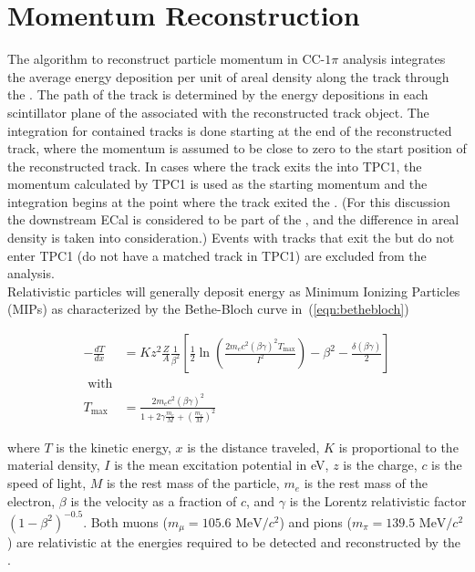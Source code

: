 \section{Momentum Reconstruction}\label{subsec:MomRecon}

The algorithm to reconstruct particle momentum in CC-$1\pi$ analysis
integrates the average energy deposition per unit of areal density
along the track through the \podtext{}. The path of the track is determined
by the energy depositions in each scintillator plane of the \podtext{}
associated with the reconstructed track object. The integration for
contained tracks is done starting at the end of the reconstructed
track, where the momentum is assumed to be close to zero to the start
position of the reconstructed track. In cases where the track exits
the \podtext{} into TPC1, the momentum calculated by TPC1 is used as the
starting momentum and the integration begins at the point where the
track exited the \podtext{}. (For this discussion the downstream ECal is
considered to be part of the \podtext{}, and the difference in areal density
is taken into consideration.) Events with tracks that exit the \podtext{}
but do not enter TPC1 (do not have a matched track in TPC1) are
excluded from the analysis.\\

Relativistic particles will generally deposit energy as Minimum
Ionizing Particles (MIPs) as characterized by the Bethe-Bloch curve in~(\ref{eqn:bethebloch})

\begin{align}\label{eqn:bethebloch}
    -\frac{dT}{dx} &= K z^2\frac{Z}{A} \frac{1}{\beta^2}\left[\frac{1}{2}\ln\left(\frac{2 m_{e}c^{2}{(\beta\gamma)}^{2}T_\text{max}}{I^2}\right) - \beta^{2} - \frac{\delta\left(\beta\gamma\right)}{2}\right] \\
    \text{~with} \nonumber \\
    T_\text{max} &= \frac{2 m_{e}c^{2}{(\beta\gamma)}^{2}}{1+2\gamma \frac{m_e}{M} + {\left(\frac{m_e}{M}\right)}^2} \nonumber
\end{align}

\noindent{}where $T$ is the kinetic energy, $x$ is the distance
traveled, $K$ is proportional to the material density, $I$ is the mean
excitation potential in eV, $z$ is the charge, $c$ is the speed of
light, $M$ is the rest mass of the particle, $m_{e}$ is the rest mass
of the electron, $\beta$ is the velocity as a fraction of $c$, and
$\gamma$ is the Lorentz relativistic factor
${\left(1-\beta^{2}\right)}^{-0.5}$.  Both muons ($m_{\mu} =
105.6\text{~MeV}/c^{2}$) and pions ($m_{\pi} = 139.5
\text{~MeV}/c^{2}$) are relativistic at the energies required to be
detected and reconstructed by the \podtext{}.

